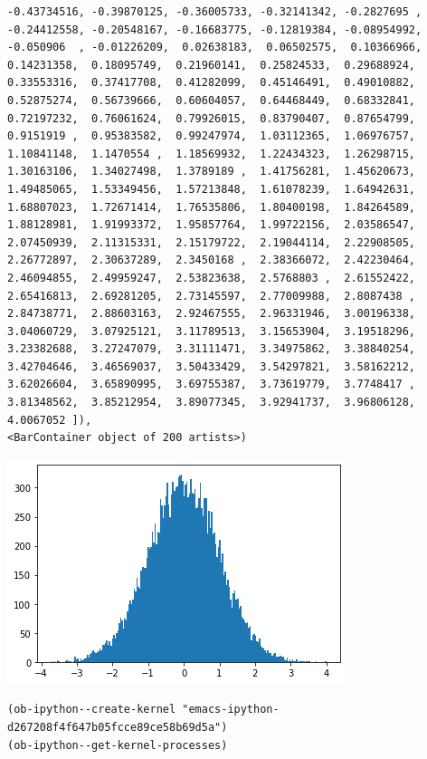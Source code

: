 \documentclass[11pt]{article}
\begin{document}
\begin{verbatim}
-0.43734516, -0.39870125, -0.36005733, -0.32141342, -0.2827695 ,
-0.24412558, -0.20548167, -0.16683775, -0.12819384, -0.08954992,
-0.050906  , -0.01226209,  0.02638183,  0.06502575,  0.10366966,
0.14231358,  0.18095749,  0.21960141,  0.25824533,  0.29688924,
0.33553316,  0.37417708,  0.41282099,  0.45146491,  0.49010882,
0.52875274,  0.56739666,  0.60604057,  0.64468449,  0.68332841,
0.72197232,  0.76061624,  0.79926015,  0.83790407,  0.87654799,
0.9151919 ,  0.95383582,  0.99247974,  1.03112365,  1.06976757,
1.10841148,  1.1470554 ,  1.18569932,  1.22434323,  1.26298715,
1.30163106,  1.34027498,  1.3789189 ,  1.41756281,  1.45620673,
1.49485065,  1.53349456,  1.57213848,  1.61078239,  1.64942631,
1.68807023,  1.72671414,  1.76535806,  1.80400198,  1.84264589,
1.88128981,  1.91993372,  1.95857764,  1.99722156,  2.03586547,
2.07450939,  2.11315331,  2.15179722,  2.19044114,  2.22908505,
2.26772897,  2.30637289,  2.3450168 ,  2.38366072,  2.42230464,
2.46094855,  2.49959247,  2.53823638,  2.5768803 ,  2.61552422,
2.65416813,  2.69281205,  2.73145597,  2.77009988,  2.8087438 ,
2.84738771,  2.88603163,  2.92467555,  2.96331946,  3.00196338,
3.04060729,  3.07925121,  3.11789513,  3.15653904,  3.19518296,
3.23382688,  3.27247079,  3.31111471,  3.34975862,  3.38840254,
3.42704646,  3.46569037,  3.50433429,  3.54297821,  3.58162212,
3.62026604,  3.65890995,  3.69755387,  3.73619779,  3.7748417 ,
3.81348562,  3.85212954,  3.89077345,  3.92941737,  3.96806128,
4.0067052 ]),
<BarContainer object of 200 artists>)
\end{verbatim}
\begin{center}
\includegraphics[width=.9\linewidth]{./obipy-resources/SU0QUr.png}
\end{center}

\begin{verbatim}
(ob-ipython--create-kernel "emacs-ipython-d267208f4f647b05fcce89ce58b69d5a")
(ob-ipython--get-kernel-processes)
\end{verbatim}
\end{document}
